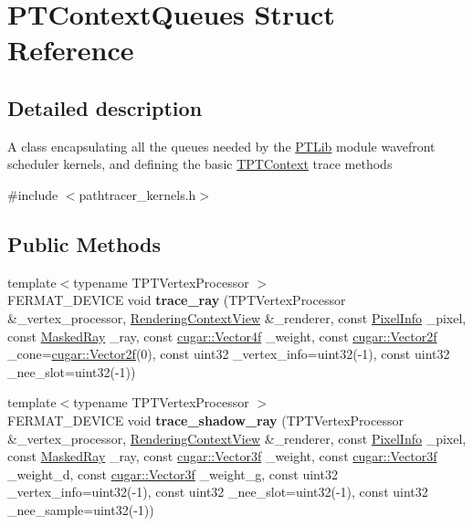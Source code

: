 \hypertarget{struct_p_t_context_queues}{}\section{P\+T\+Context\+Queues Struct Reference}
\label{struct_p_t_context_queues}


\subsection{Detailed description}
A class encapsulating all the queues needed by the \hyperlink{group___p_t_lib}{P\+T\+Lib} module wavefront scheduler kernels, and defining the basic \hyperlink{_p_t_lib_page_TPTContext}{T\+P\+T\+Context} trace methods 

{\ttfamily \#include $<$pathtracer\+\_\+kernels.\+h$>$}

\subsection*{Public Methods}
\begin{DoxyCompactItemize}
\item 
\mbox{\label{struct_p_t_context_queues_aa9fc6e82db6ce42635aad1dd8bbe00d2}} 
{\footnotesize template$<$typename T\+P\+T\+Vertex\+Processor $>$ }\\F\+E\+R\+M\+A\+T\+\_\+\+D\+E\+V\+I\+CE void {\bfseries trace\+\_\+ray} (T\+P\+T\+Vertex\+Processor \&\+\_\+vertex\+\_\+processor, \hyperlink{struct_rendering_context_view}{Rendering\+Context\+View} \&\+\_\+renderer, const \hyperlink{union_pixel_info}{Pixel\+Info} \+\_\+pixel, const \hyperlink{struct_masked_ray}{Masked\+Ray} \+\_\+ray, const \hyperlink{structcugar_1_1_vector}{cugar\+::\+Vector4f} \+\_\+weight, const \hyperlink{structcugar_1_1_vector}{cugar\+::\+Vector2f} \+\_\+cone=\hyperlink{structcugar_1_1_vector}{cugar\+::\+Vector2f}(0), const uint32 \+\_\+vertex\+\_\+info=uint32(-\/1), const uint32 \+\_\+nee\+\_\+slot=uint32(-\/1))
\item 
\mbox{\label{struct_p_t_context_queues_ac58a4fe68d7ebc8805218c22a4017f30}} 
{\footnotesize template$<$typename T\+P\+T\+Vertex\+Processor $>$ }\\F\+E\+R\+M\+A\+T\+\_\+\+D\+E\+V\+I\+CE void {\bfseries trace\+\_\+shadow\+\_\+ray} (T\+P\+T\+Vertex\+Processor \&\+\_\+vertex\+\_\+processor, \hyperlink{struct_rendering_context_view}{Rendering\+Context\+View} \&\+\_\+renderer, const \hyperlink{union_pixel_info}{Pixel\+Info} \+\_\+pixel, const \hyperlink{struct_masked_ray}{Masked\+Ray} \+\_\+ray, const \hyperlink{structcugar_1_1_vector}{cugar\+::\+Vector3f} \+\_\+weight, const \hyperlink{structcugar_1_1_vector}{cugar\+::\+Vector3f} \+\_\+weight\+\_\+d, const \hyperlink{structcugar_1_1_vector}{cugar\+::\+Vector3f} \+\_\+weight\+\_\+g, const uint32 \+\_\+vertex\+\_\+info=uint32(-\/1), const uint32 \+\_\+nee\+\_\+slot=uint32(-\/1), const uint32 \+\_\+nee\+\_\+sample=uint32(-\/1))
\end{DoxyCompactItemize}
